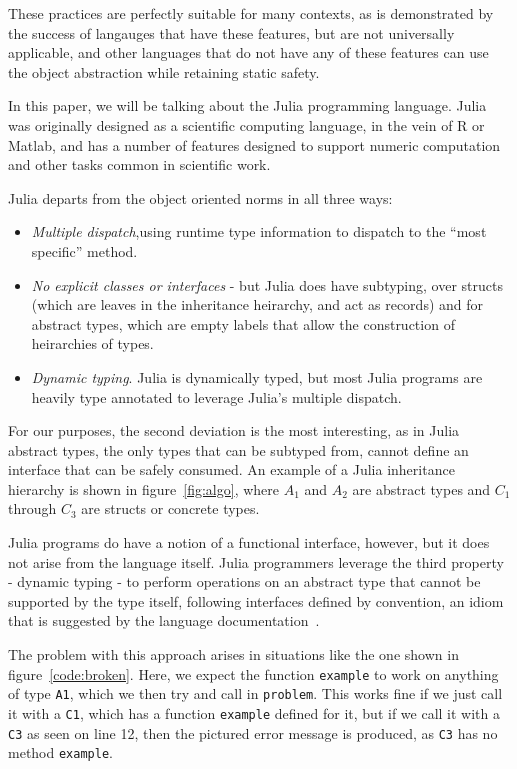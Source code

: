 \documentclass[preprint]{sigplanconf}
\newcommand{\xt}[1]{\texttt{#1}}
\begin{document}
These practices are perfectly suitable for many contexts,
as is demonstrated by the success of langauges that have 
these features, but are not universally applicable, and
other languages that do not have any of these features
can use the object abstraction while retaining static 
safety.

In this paper, we will be talking about the Julia
programming language. Julia was originally designed
as a scientific computing language, in the vein of 
R or Matlab, and has a number of features designed
to support numeric computation and other tasks common
in scientific work.

Julia departs from the object oriented norms in all 
three ways:
\begin{itemize}
\item \emph{Multiple dispatch},using runtime type
information to dispatch to the ``most specific'' method.
\item \emph{No explicit classes or interfaces} - 
but Julia does have subtyping, over structs (which are leaves in
the inheritance heirarchy, and act as records) and for 
abstract types, which are empty labels that allow the 
construction of heirarchies of types.
\item \emph{Dynamic typing}. Julia is dynamically typed,
but most Julia programs are heavily type annotated to leverage
Julia's multiple dispatch.
\end{itemize}

For our purposes, the second deviation is the most interesting, as in Julia
abstract types, the only types that can be subtyped from, cannot define an
interface that can be safely consumed. An example of a Julia inheritance hierarchy
is shown in figure~\ref{fig:algo}, where $A_1$ and $A_2$ are abstract types and
$C_1$ through $C_3$ are structs or concrete types.

Julia programs do have a notion of a functional interface, however, but it does
not arise from the language itself. Julia programmers leverage the third property
- dynamic typing - to perform operations on an abstract type that cannot be supported
by the type itself, following interfaces defined by convention, an idiom that is suggested
by the language documentation~\cite{juliadocu}.

The problem with this approach arises in situations like the one shown in figure~\ref{code:broken}.
Here, we expect the function \xt{example} to work on anything of type \xt{A1}, which we then
try and call in \xt{problem}. This works fine if we just call it with a \xt{C1}, which has
a function \xt{example} defined for it, but if we call it with a \xt{C3} as seen on line 12,
then the pictured error message is produced, as \xt{C3} has no method \xt{example}.
\end{document}
